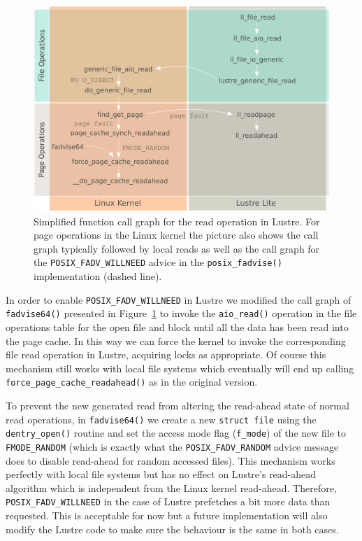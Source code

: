 \begin{figure}[!htb]
  \centering
  \includegraphics[width=\textwidth]{chapters/chapter2/figures/linux_lustre_1}
  \caption{Simplified function call graph for the read operation in Lustre. For page operations in the Linux kernel the picture also shows the call graph typically followed by local reads as well as the call graph for the \texttt{POSIX\_FADV\_WILLNEED} advice in the \texttt{posix\_fadvise()} implementation (dashed line).}
  \label{figure: kernel}
\end{figure}

In order to enable \texttt{POSIX\_FADV\_WILLNEED} in Lustre we modified the call graph of \texttt{fadvise64()} presented in Figure~\ref{figure: kernel} to invoke the \texttt{aio\_read()} operation in the file operations table for the open file and block until all the data has been read into the page cache. In this way we can force the kernel to invoke the corresponding file read operation in Lustre, acquiring locks as appropriate. Of course this mechanism still works with local file systems which eventually will end up calling \texttt{force\_page\_cache\_readahead()} as in the original version.

To prevent the new generated read from altering the read-ahead state of normal read operations, in \texttt{fadvise64()} we create a new \texttt{struct file} using the \texttt{dentry\_open()} routine and set the access mode flag (\texttt{f\_mode}) of the new file to \texttt{FMODE\_RANDOM} (which is exactly what the \texttt{POSIX\_FADV\_RANDOM} advice message does to disable read-ahead for random accessed files). This mechanism works perfectly with local file systems but has no effect on Lustre's read-ahead algorithm which is independent from the Linux kernel read-ahead. Therefore, \texttt{POSIX\_FADV\_WILLNEED} in the case of Lustre prefetches a bit more data than requested. This is acceptable for now but a future implementation will also modify the Lustre code to make sure the behaviour is the same in both cases.

